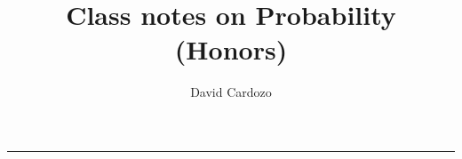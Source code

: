 \documentclass[notitlepage]{article}
\author{David Cardozo}
\title{Class notes on Probability (Honors)}
\begin{document}



\noindent\rule{\textwidth}{1pt}\\[-0.1cm]


	
	
\end{document}
